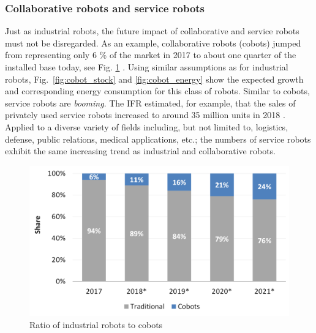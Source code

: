 \subsubsection{Collaborative robots and service robots}
Just as industrial robots, the future impact of collaborative and service robots must not be disregarded. As an example, collaborative robots (cobots) jumped from representing only 6 \% of the market in 2017 to about one quarter of the installed base today, see Fig. \ref{fig:industrial_cobot_share} \cite{tobe2015}. Using similar assumptions as for industrial robots, Fig.~\ref{fig:cobot_stock} and \ref{fig:cobot_energy} show the expected growth and corresponding energy consumption for this class of robots. Similar to cobots, service robots are \textit{booming}. The IFR estimated, for example, that the sales of privately used service robots increased to around 35 million units in 2018 \cite{IFR2015}. Applied to a diverse variety of fields including, but not limited to, logistics, defense, public relations, medical applications, etc.; the numbers of service robots exhibit the same increasing trend as industrial and collaborative robots.
\begin{figure}[!t]
	\centering
    \includegraphics[width= 0.9\columnwidth]{fig/share_industrial_and_cobots} 
	\caption{Ratio of industrial robots to cobots \cite{statista_ir_cobot_share}}
    \label{fig:industrial_cobot_share}
\end{figure}
